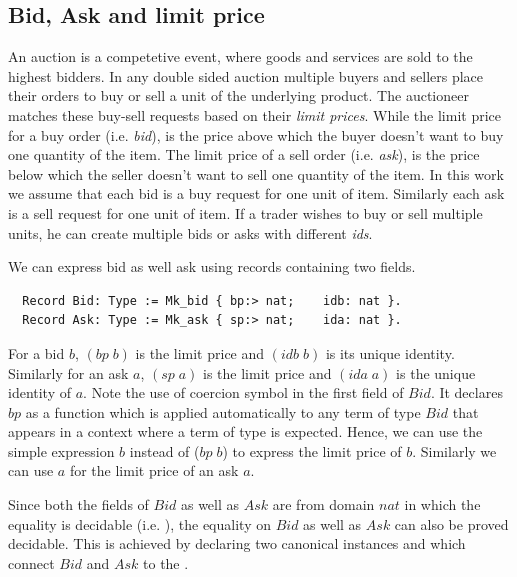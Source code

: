 \documentclass[a4paper,UKenglish,cleveref, autoref]{lipics-v2019}
\begin{document}
\subsection{Bid, Ask and limit price}
An auction is a competetive event, where goods and services are sold to the highest bidders. In  any double sided auction multiple buyers and sellers place their orders to buy or sell a unit of the underlying product. The  auctioneer matches these buy-sell requests  based on their \emph{limit prices}. While the limit price for a buy order (i.e. \emph{bid}), is the price above which the buyer doesn't want to buy one quantity of the item. The limit price of a sell order (i.e. \emph{ask}), is the price below which the seller doesn't want to sell one quantity of the item.  In this work we assume that each bid is a buy request for one unit of item. Similarly each ask is a sell request for one unit of item. If a trader wishes to buy or sell multiple units, he can create multiple bids or asks with different \emph{ids}. 

We can express bid as well ask using  records containing two fields. 
\begin{verbatim}
  Record Bid: Type := Mk_bid { bp:> nat;    idb: nat }.
  Record Ask: Type := Mk_ask { sp:> nat;    ida: nat }.
\end{verbatim}
For a bid $b$, $(bp \; b)$  is the limit price and $(idb \; b)$ is its unique identity. Similarly for an ask $a$, $(sp \; a)$ is the limit price and $(ida \; a)$ is the unique identity of $a$. Note the use of coercion symbol \tw{ :>} in the first field of $Bid$. It declares $bp$ as a function which is applied automatically to any term of type $Bid$ that appears in a context where a term of type  is expected. Hence, we can use the simple expression $b$ instead of  ($bp \;b$) to express the limit price of $b$. Similarly we can use $a$ for the limit price of an ask $a$.


Since both the fields of $Bid$ as well as $Ask$ are from domain $nat$ in which the equality is decidable (i.e. ), the equality on $Bid$ as well as $Ask$ can also be proved  decidable. This is achieved by declaring two canonical instances  and  which connect $Bid$ and $Ask$ to the .  
\end{document}
